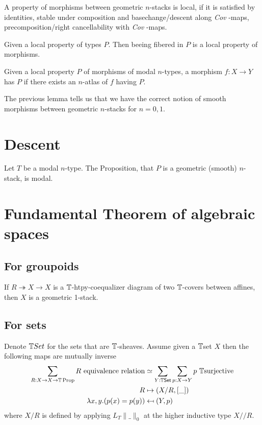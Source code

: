 \documentclass{article}
\newcommand{\Cov}{\emph{Cov} }
\begin{document}
\begin{definition}
    A property of morphisms between geometric $n$-stacks is local, if it is satisfied by identities, stable under composition and basechange/descent along \Cov-maps, precomposition/right cancellability with \Cov-maps.
\end{definition}
\begin{lemma}
    Given a local property of types $P$. Then beeing fibered in $P$ is a local property of morphisms.
\end{lemma}
\begin{lemma}
    Given a local property $P$ of morphisms of modal $n$-types, a morphism $f : X \to Y$ has $P$ if there exists an $n$-atlas of $f$ having $P$.
\end{lemma}
The previous lemma tells us that we have the correct notion of smooth morphisms between geometric $n$-stacks for $n = 0,1$.
\section{Descent}
 \begin{theorem}{\label{thm:descent}}
     Let $T$ be a modal $n$-type. The Proposition, that $P$ is a geometric (smooth) $n$-stack, is modal.
 \end{theorem}
\section{Fundamental Theorem of algebraic spaces}
\subsection{For groupoids}
\begin{lemma}
    If $R \twoheadrightarrow X \to X$ is a $\mathbb{T}$-htpy-coequalizer diagram of two $\mathbb{T}$-covers between affines, then $X$ is a geometric 1-stack.
\end{lemma}

\subsection{For sets}
\begin{lemma}\label{quotient-by-equivalence-relation}
Denote $\mathbb{T} Set$ for the sets that are $\mathbb{T}$-sheaves. Assume given a $\mathbb{T}$set  $X$ then the following maps are mutually inverse
\begin{align*}
\sum_{R:X\to X\to \bT\Prop} R\ \mathrm{equivalence\ relation} &\simeq \sum_{Y:\bT \mathrm{\Set}} \sum_{p:X\to Y} p\ \bT\mathrm{surjective} \\
R &\mapsto (X/R,[\_]) \\
 \lambda x,y.  (p(x)=p(y)) &\mapsfrom (Y,p) 
 \end{align*}
where $X / R$ is defined by applying $L_T \| \_ \|_0 $ at the higher inductive type $X // R$.
\end{lemma}
\end{document}
